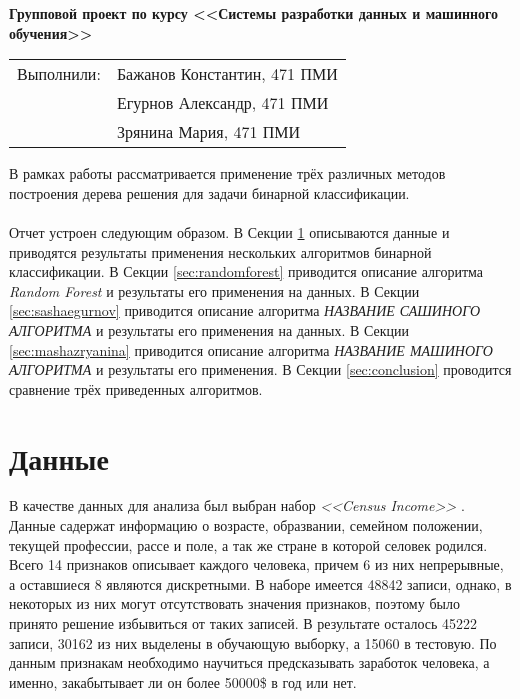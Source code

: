 \documentclass[12pt,a4paper]{article}
\begin{document}
\begin{center}
    \Large \bf Групповой проект по курсу <<Системы разработки данных и машинного обучения>>
\end{center}

\begin{flushleft}
    \begin{tabular}[H]{ll}
        Выполнили: & Бажанов Константин, 471 ПМИ\\
        &Егурнов Александр, 471 ПМИ\\
        &Зрянина Мария, 471 ПМИ\\
    \end{tabular}
\end{flushleft}

В рамках работы рассматривается применение трёх различных методов построения дерева решения для задачи бинарной классификации.\\\\
Отчет устроен следующим образом. В Секции \ref{sec:data} описываются данные и приводятся результаты применения нескольких алгоритмов бинарной классификации.
В Секции \ref{sec:randomforest} приводится описание алгоритма {\it Random Forest} и результаты его применения на данных.
В Секции \ref{sec:sashaegurnov} приводится описание алгоритма {\it НАЗВАНИЕ САШИНОГО АЛГОРИТМА} и результаты его применения на данных.
В Секции \ref{sec:mashazryanina} приводится описание алгоритма {\it НАЗВАНИЕ МАШИНОГО АЛГОРИТМА} и результаты его применения.
В Секции \ref{sec:conclusion} проводится сравнение трёх приведенных алгоритмов.

\section{Данные}
\label{sec:data}

В качестве данных для анализа был выбран набор {\it <<Census Income>>} \cite{Kohavi+Becker:1996}.
Данные садержат информацию о возрасте, образвании, семейном положении, текущей профессии, рассе и поле, а так же стране в которой селовек родился.
Всего 14 признаков описывает каждого человека, причем 6 из них непрерывные, а оставшиеся 8 являются дискретными.
В наборе имеется 48842 записи, однако, в некоторых из них могут отсутствовать значения признаков, поэтому было принято решение избывиться от таких записей.
В результате осталось 45222 записи, 30162 из них выделены в обучающую выборку, а 15060 в тестовую.
По данным признакам необходимо научиться предсказывать заработок человека, а именно, закабытывает ли он более 50000\$ в год или нет.\\
\end{document}
